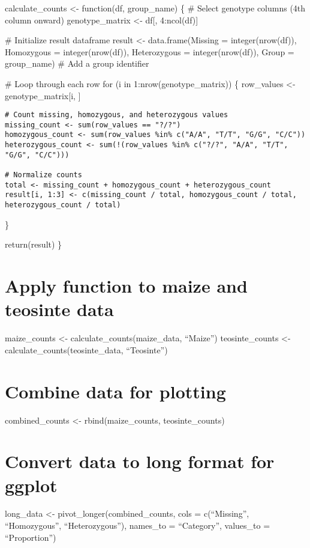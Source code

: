 \documentclass[
]{article}
\begin{document}
calculate\_counts \textless- function(df, group\_name) \{ \# Select
genotype columns (4th column onward) genotype\_matrix \textless- df{[},
4:ncol(df){]}

\# Initialize result dataframe result \textless- data.frame(Missing =
integer(nrow(df)), Homozygous = integer(nrow(df)), Heterozygous =
integer(nrow(df)), Group = group\_name) \# Add a group identifier

\# Loop through each row for (i in 1:nrow(genotype\_matrix)) \{
row\_values \textless- genotype\_matrix{[}i, {]}

\begin{verbatim}
# Count missing, homozygous, and heterozygous values
missing_count <- sum(row_values == "?/?")
homozygous_count <- sum(row_values %in% c("A/A", "T/T", "G/G", "C/C"))
heterozygous_count <- sum(!(row_values %in% c("?/?", "A/A", "T/T", "G/G", "C/C")))

# Normalize counts
total <- missing_count + homozygous_count + heterozygous_count
result[i, 1:3] <- c(missing_count / total, homozygous_count / total, heterozygous_count / total)
\end{verbatim}

\}

return(result) \}

\section{Apply function to maize and teosinte
data}\label{apply-function-to-maize-and-teosinte-data}

maize\_counts \textless- calculate\_counts(maize\_data, ``Maize'')
teosinte\_counts \textless- calculate\_counts(teosinte\_data,
``Teosinte'')

\section{Combine data for plotting}\label{combine-data-for-plotting}

combined\_counts \textless- rbind(maize\_counts, teosinte\_counts)

\section{Convert data to long format for
ggplot}\label{convert-data-to-long-format-for-ggplot}

long\_data \textless- pivot\_longer(combined\_counts, cols =
c(``Missing'', ``Homozygous'', ``Heterozygous''), names\_to =
``Category'', values\_to = ``Proportion'')
\end{document}
